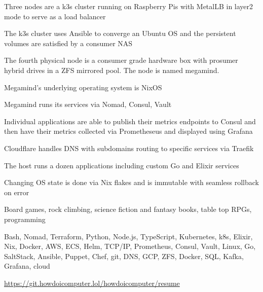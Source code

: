 \begin{cventries}
  \cventry
    {}
    {}
    {}
    {}
    {
      \begin{cvitems}
        \item {Three nodes are a k3s cluster running on Raspberry Pis with MetalLB in layer2 mode to serve as a load balancer}
        \item {The k3s cluster uses Ansible to converge an Ubuntu OS and the persistent volumes are satisfied by a consumer NAS}
        \item {The fourth physical node is a consumer grade hardware box with prosumer hybrid drives in a ZFS mirrored pool. The node is named megamind.}
        \item {Megamind's underlying operating system is NixOS}
        \item {Megamind runs its services via Nomad, Consul, Vault}
        \item {Individual applications are able to publish their metrics endpoints to Consul and then have their metrics collected via Prometheseus and displayed using Grafana}
        \item {Cloudflare handles DNS with subdomains routing to specific services via Traefik}
        \item {The host runs a dozen applications including custom Go and Elixir services}
        \item {Changing OS state is done via Nix flakes and is immutable with seamless rollback on error}
      \end{cvitems}
    }
\end{cventries}

\begin{cventries}
  \cventry
    {}
    {}
    {}
    {}
    {
      \begin{cvitems}
        \item {Board games, rock climbing, science fiction and fantasy books, table top RPGs, programming}
      \end{cvitems}
    }
\end{cventries}

\begin{cventries}
  \cventry
    {}
    {}
    {}
    {}
    {
      \begin{cvitems}
        \item {Bash, Nomad, Terraform, Python, Node.js, TypeScript, Kubernetes, k8s, Elixir, Nix, Docker, AWS, ECS, Helm, TCP/IP, Prometheus, Consul, Vault, Linux, Go, SaltStack, Ansible, Puppet, Chef, git, DNS, GCP, ZFS, Docker, SQL, Kafka, Grafana, cloud}
      \end{cvitems}
    }
\end{cventries}

\begin{cventries}
  \cventry
    {}
    {}
    {}
    {}
    {
      \begin{cvitems}
        \item \href{https://git.howdoicomputer.lol/howdoicomputer/resume}{https://git.howdoicomputer.lol/howdoicomputer/resume}
      \end{cvitems}
    }
\end{cventries}

